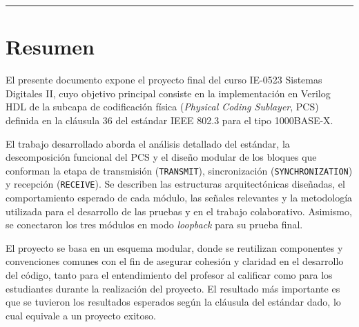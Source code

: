 \bgroup
\color{abs}
\hrule
\egroup

\section{Resumen}

El presente documento expone el proyecto final del curso IE-0523 Sistemas Digitales II, cuyo objetivo principal consiste en la implementación en Verilog HDL de la subcapa de codificación física (\textit{Physical Coding Sublayer}, PCS) definida en la cláusula 36 del estándar IEEE 802.3 para el tipo 1000BASE-X.

El trabajo desarrollado aborda el análisis detallado del estándar, la descomposición funcional del PCS y el diseño modular de los bloques que conforman la etapa de transmisión (\texttt{TRANSMIT}), sincronización (\texttt{SYNCHRONIZATION}) y recepción (\texttt{RECEIVE}).
Se describen las estructuras arquitectónicas diseñadas, el comportamiento esperado de cada módulo, las señales relevantes y la metodología utilizada para el desarrollo de las pruebas y en el trabajo colaborativo.
Asimismo, se conectaron los tres módulos en modo \textit{loopback} para su prueba final.

El proyecto se basa en un esquema modular, donde se reutilizan componentes y convenciones comunes con el fin de asegurar cohesión y claridad en el desarrollo del código, tanto para el entendimiento del profesor al calificar como para los estudiantes durante la realización del proyecto.
El resultado más importante es que se tuvieron los resultados esperados según la cláusula del estándar dado, lo cual equivale a un proyecto exitoso.
